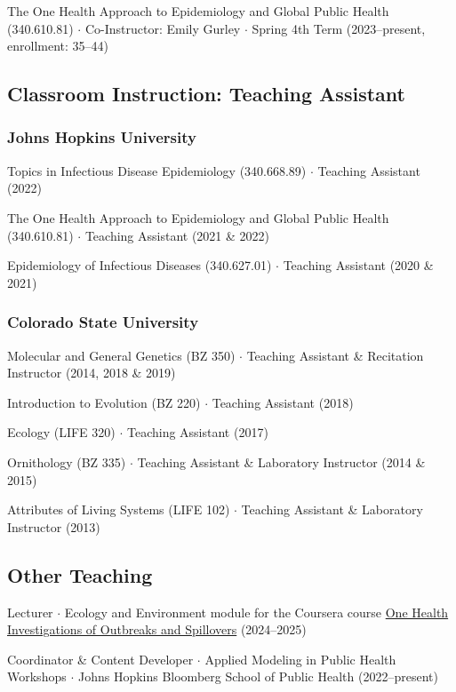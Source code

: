 \documentclass{cv}
\begin{document}
The One Health Approach to Epidemiology and Global Public Health (340.610.81) $\cdot$ Co-Instructor: Emily Gurley $\cdot$ Spring 4th Term (2023--present, enrollment: 35--44)

\subsection*{Classroom Instruction: Teaching Assistant}

\subsubsection*{Johns Hopkins University}

Topics in Infectious Disease Epidemiology (340.668.89) $\cdot$ Teaching Assistant (2022)

The One Health Approach to Epidemiology and Global Public Health (340.610.81) $\cdot$ Teaching Assistant (2021 \& 2022)

Epidemiology of Infectious Diseases (340.627.01) $\cdot$ Teaching Assistant (2020 \& 2021)

\subsubsection*{Colorado State University}

Molecular and General Genetics (BZ 350) $\cdot$ Teaching Assistant \& Recitation Instructor (2014, 2018 \& 2019)

Introduction to Evolution (BZ 220) $\cdot$ Teaching Assistant (2018)

Ecology (LIFE 320) $\cdot$ Teaching Assistant (2017)

Ornithology (BZ 335) $\cdot$ Teaching Assistant \& Laboratory Instructor (2014 \& 2015)

Attributes of Living Systems (LIFE 102) $\cdot$ Teaching Assistant \& Laboratory Instructor (2013)

\subsection*{Other Teaching}

Lecturer $\cdot$ Ecology and Environment module for the Coursera course \href{https://www.coursera.org/learn/one-health-investigations-of-outbreaks-and-spillover-events}{One Health Investigations of Outbreaks and Spillovers} (2024--2025)

Coordinator \& Content Developer $\cdot$ Applied Modeling in Public Health Workshops $\cdot$ Johns Hopkins Bloomberg School of Public Health (2022--present)
\end{document}
